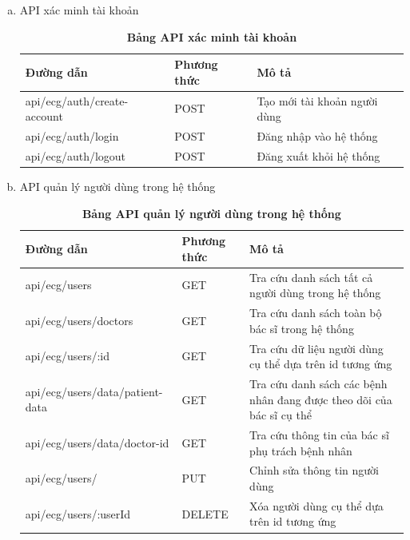 \begin{enumerate}[a)]
	\item API xác minh tài khoản

	\begin{xltabular}{\textwidth}{
	  | >{\raggedright\arraybackslash}m{4.6cm}
	  | >{\centering\arraybackslash}m{2.8cm}
	  | >{\raggedright\arraybackslash}X |
	  }
	  \caption{\bfseries \fontsize{12pt}{0pt}\selectfont Bảng API xác minh tài khoản}
	  \label{table_api_auth}
	  \\
	  \hline
	  \bfseries Đường dẫn    &\bfseries Phương thức    &\bfseries Mô tả\\ \hline
	  api/ecg/auth/create-account   &   POST  & Tạo mới tài khoản người dùng \\ \hline
	  api/ecg/auth/login   &    POST    & Đăng nhập vào hệ thống \\ \hline
	  api/ecg/auth/logout   &    POST    & Đăng xuất khỏi hệ thống \\ \hline
	\end{xltabular}
  
	\item API quản lý người dùng trong hệ thống
	\begin{xltabular}{\textwidth}{
	  | >{\raggedright\arraybackslash}m{4.6cm}
	  | >{\centering\arraybackslash}m{2.8cm}
	  | >{\raggedright\arraybackslash}X |
	  }
	  \caption{\bfseries \fontsize{12pt}{0pt}\selectfont Bảng API quản lý người dùng trong hệ thống}
	  \label{table_api_user}
	  \\
	  \hline
	  \bfseries Đường dẫn    &\bfseries Phương thức    &\bfseries Mô tả\\ \hline
	  api/ecg/users   &   GET  &  Tra cứu danh sách tất cả người dùng trong hệ thống\\  \hline
	  api/ecg/users/doctors   &   GET  &  Tra cứu danh sách toàn bộ bác sĩ trong hệ thống \\  \hline
	  api/ecg/users/:id   &   GET  &  Tra cứu dữ liệu người dùng cụ thể dựa trên id tương ứng \\  \hline
	  api/ecg/users/data/patient-data   &   GET  &  Tra cứu danh sách các bệnh nhân đang được theo dõi của bác sĩ cụ thể \\  \hline
	  api/ecg/users/data/doctor-id   &   GET  &  Tra cứu thông tin của bác sĩ phụ trách bệnh nhân \\  \hline
	  api/ecg/users/   &   PUT  &  Chỉnh sửa thông tin người dùng \\  \hline
	  api/ecg/users/:userId  &   DELETE  &  Xóa người dùng cụ thể dựa trên id tương ứng \\  \hline
	\end{xltabular}
  

\end{enumerate}
